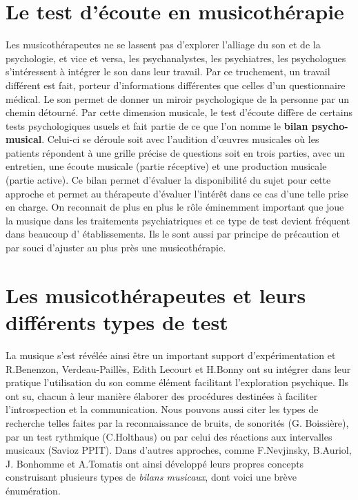 \section{Le test d'écoute en musicothérapie}

Les musicothérapeutes ne se lassent pas d'explorer l'alliage du son
 et de la psychologie, et vice
 et versa, les psychanalystes, les psychiatres, les psychologues
 s'intéressent à intégrer le son dans leur travail. Par ce truchement,
 un travail différent est fait, porteur d'informations différentes que
 celles d'un questionnaire médical. Le son permet de donner un miroir
 psychologique de la personne par un chemin détourné. Par cette dimension
 musicale, le test d'écoute diffère de certains tests psychologiques usuels
 et fait partie de ce que l'on nomme le \textbf{ bilan
   psycho-musical}. Celui-ci se déroule soit avec l'audition d'\oe uvres
 musicales où les patients répondent à une grille précise de questions
  soit en trois parties, avec un entretien,
 une écoute musicale (partie réceptive) et une production musicale
 (partie active).
Ce bilan permet d'évaluer la disponibilité du sujet pour cette
approche et permet au thérapeute d'évaluer l'intérêt dans ce cas
d'une telle prise en charge.
 On reconnait de plus en plus le rôle éminemment important que joue la musique
 dans les traitements psychiatriques et ce type de test devient
 fréquent dans beaucoup d' établissements. Ils le sont aussi par principe de précaution et
 par souci d'ajuster au plus près une
 musicothérapie.



  
\section{Les musicothérapeutes et leurs différents types de test}
\label{musicothEtpsycho}

	 La musique s'est révélée ainsi être un important support
         d'expérimentation et 
	 R.Benenzon,  Verdeau-Paillès, Edith
         Lecourt et H.Bonny ont su intégrer dans leur pratique l'utilisation du son comme
         élément facilitant l'exploration psychique.
         Ils ont su, chacun à leur manière  élaborer des procédures destinées à faciliter
         l'introspection et la communication.
Nous pouvons aussi citer les types de recherche telles faites par la reconnaissance de
bruits, de sonorités (G. Boissière), par un test rythmique
(C.Holthaus) ou par celui
des réactions aux intervalles musicaux (Savioz PPIT).
		  Dans d'autres approches, comme F.Nevjinsky, B.Auriol, J. Bonhomme
           et A.Tomatis ont ainsi développé leurs propres
           concepts construisant plusieurs types de \emph{bilans musicaux},
           dont voici une brève énumération.
           

